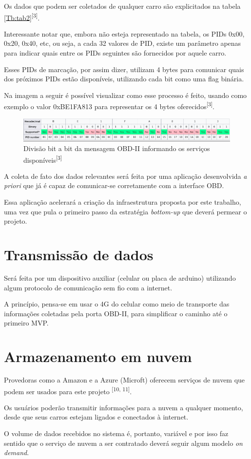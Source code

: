 Os dados que podem ser coletados de qualquer carro são explicitados na tabela \ref{Tb:tab2}\textsuperscript{[3]}.



Interessante notar que, embora não esteja representado na tabela, os PIDs 0x00, 0x20, 0x40, etc, ou seja, a cada 32 valores de PID, existe um parâmetro apenas para indicar quais entre os PIDs seguintes são fornecidos por aquele carro.

Esses PIDs de marcação, por assim dizer, utilizam 4 bytes para comunicar quais dos próximos PIDs estão disponíveis, utilizando cada bit como uma flag binária. 

Na imagem a seguir é possível visualizar como esse processo é feito, usando como exemplo o valor 0xBE1FA813 para representar os 4 bytes oferecidos\textsuperscript{[3]}.

\begin{figure}[hp]
    \centering
    
    \includegraphics[scale=0.7]{figures/tabela_dados_disponiveis.png}
    
    \caption{Divisão bit a bit da mensagem OBD-II informando os serviços disponíveis\textsuperscript{[3]}}
\end{figure}

A coleta de fato dos dados relevantes será feita por uma aplicação desenvolvida \textit{a priori} que já é capaz de comunicar-se corretamente com a interface OBD.

Essa aplicação acelerará a criação da infraestrutura proposta por este trabalho, uma vez que pula o primeiro passo da estratégia \textit{bottom-up} que deverá permear o projeto.

\section{Transmissão de dados}
Será feita por um dispositivo auxiliar (celular ou placa de arduino) utilizando algum protocolo de comunicação sem fio com a internet.

A princípio, pensa-se em usar o 4G do celular como meio de transporte das informações coletadas pela porta OBD-II, para simplificar o caminho até o primeiro MVP.

\section{Armazenamento em nuvem}
Provedoras como a Amazon e a Azure (Microft) oferecem serviços de nuvem que podem ser usados para este projeto \textsuperscript{[10, 11]}.

Os usuários poderão transmitir informações para a nuvem a qualquer momento, desde que seus carros estejam ligados e conectados à internet.

O volume de dados recebidos no sistema é, portanto, variável e por isso faz sentido que o serviço de nuvem a ser contratado deverá seguir algum modelo \textit{on demand}.